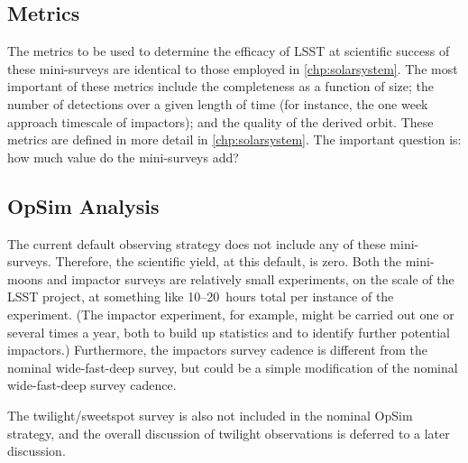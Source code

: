 
\subsection{Metrics}
\label{sec:\secname:metrics}

The metrics to be used to determine the efficacy of LSST
at scientific success of these mini-surveys are identical
to those employed in \autoref{chp:solarsystem}.
The most important of these metrics
include the completeness as a function of size; the
number of detections over a given length of time (for instance,
the one week approach timescale of impactors); and
the quality of the derived orbit. These metrics are defined
in more detail in \autoref{chp:solarsystem}. The important question is:
how much value do the mini-surveys add?



\subsection{OpSim Analysis}
\label{sec:\secname:analysis}

The current default observing strategy does not include
any of these mini-surveys. Therefore, the scientific yield,
at this default, is zero. Both the mini-moons and impactor
surveys are relatively small experiments, on the scale of
the LSST project, at something like 10--20~hours total
per instance of the experiment. (The impactor experiment,
for example, might be carried out one or several times a year,
both to build up statistics and to identify further potential
impactors.) Furthermore, the impactors survey cadence
is different from the nominal wide-fast-deep survey,
but could be a simple modification of the nominal wide-fast-deep survey
cadence.

The twilight/sweetspot survey is also not included in
the nominal OpSim strategy, and the overall discussion
of twilight observations is deferred to a later discussion.

%
%
%
%


\navigationbar
